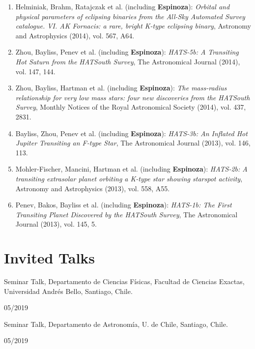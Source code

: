 \documentclass[12pt, a4paper]{article} %
\begin{document}
\begin{flushleft}
\begin{enumerate}
\item Helminiak, Brahm, Ratajczak et al. (including \textbf{Espinoza}): \textit{Orbital and physical parameters of eclipsing binaries from the All-Sky Automated Survey catalogue. VI. AK Fornacis: a rare, bright K-type eclipsing binary}, Astronomy and Astrophysics (2014), vol. 567, A64.
\item Zhou, Bayliss, Penev et al. (including \textbf{Espinoza}): \textit{HATS-5b: A Transiting Hot Saturn from the HATSouth Survey}, The Astronomical Journal (2014), vol. 147, 144.
\item Zhou, Bayliss, Hartman et al. (including \textbf{Espinoza}): \textit{The mass-radius relationship for very low mass stars: four new discoveries from the HATSouth Survey}, Monthly Notices of the Royal Astronomical Society (2014), vol. 437, 2831.
\item Bayliss, Zhou, Penev et al. (including \textbf{Espinoza}): \textit{HATS-3b: An Inflated Hot Jupiter Transiting an F-type Star}, The Astronomical Journal (2013), vol. 146, 113.
\item Mohler-Fischer, Mancini, Hartman et al. (including \textbf{Espinoza}): \textit{HATS-2b: A transiting extrasolar planet orbiting a K-type star showing starspot activity}, Astronomy and Astrophysics (2013), vol. 558, A55.
\item Penev, Bakos, Bayliss et al. (including \textbf{Espinoza}): \textit{HATS-1b: The First Transiting Planet Discovered by the HATSouth Survey}, The Astronomical Journal (2013), vol. 145, 5.
\end{enumerate}
\end{flushleft}



\section*{Invited Talks}

\begin{minipage}[t]{0.7\textwidth}
\begin{flushleft}%
  \setlength{\leftskip}{0.2cm}%
Seminar Talk, Departamento de Ciencias F\'isicas, Facultad de Ciencias
Exactas, Universidad Andr\'es Bello, Santiago, Chile.
\end{flushleft}
\end{minipage}
\begin{minipage}[t]{0.3\textwidth}
\hfill 05/2019
\end{minipage}


\begin{minipage}[t]{0.7\textwidth}
\begin{flushleft}%
  \setlength{\leftskip}{0.2cm}%
Seminar Talk, Departamento de Astronom\'ia, U. de Chile, Santiago, Chile.
\end{flushleft}
\end{minipage}
\begin{minipage}[t]{0.3\textwidth}
\hfill 05/2019
\end{minipage}
\end{document}
